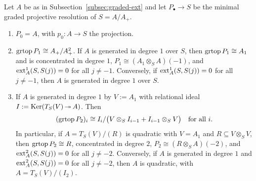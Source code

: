 \begin{proposition}\label{prop:resolution-first-terms}
Let $A$ be as in Subsection~\ref{subsec:graded-ext} and let $P_\bullet\to S$ be the minimal graded projective resolution of $S=A/A_+$.
\begin{enumerate}
\item $P_0=A$, with $p_0:A\to S$ the projection.
\item $\operatorname{grtop}\nolimits P_1\cong A_+/A_+^2$.
If $A$ is generated in degree $1$ over $S$, then $\operatorname{grtop}\nolimits P_1\cong A_1$ and is concentrated in degree $1$, $P_1\cong(A_1\otimes_SA)(-1)$, and $\operatorname{ext}\nolimits_A^1(S,S(j))=0$ for all $j\neq-1$.
Conversely, if $\operatorname{ext}\nolimits_A^1(S,S(j))=0$ for all $j\neq-1$, then $A$ is generated in degree $1$ over $S$.

\item If $A$ is generated in degree $1$ by $V:=A_1$ with relational ideal $I:=\operatorname{Ker}\nolimits(T_S(V)\operatorname{\twoheadrightarrow} A)$.
Then
\[
(\operatorname{grtop}\nolimits P_2)_i\cong I_i/\bigl(V\otimes_SI_{i-1}+I_{i-1}\otimes_SV\bigr)\quad\text{for all }i.
\]
In particular, if $A=T_S(V)/(R)$ is quadratic with $V=A_1$ and $R\subseteq V\otimes_SV$, then $\operatorname{grtop}\nolimits P_2\cong R$, concentrated in degree $2$, $P_2\cong(R\otimes_SA)(-2)$, and $\operatorname{ext}\nolimits_A^2(S,S(j))=0$ for all $j\neq-2$.
Conversely, if $A$ is generated in degree $1$ and $\operatorname{ext}\nolimits_A^2(S,S(j))=0$ for all $j\neq-2$, then $A$ is quadratic, with $A=T_S(V)/(I_2)$.
\end{enumerate}
\end{proposition}


